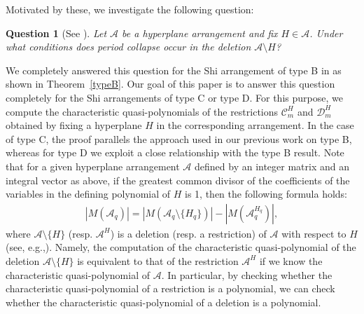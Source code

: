 \documentclass{article}
\theoremstyle{plain}
\newtheorem{Que}[Them]{Question}
\theoremstyle{definition}
\theoremstyle{remark}
\numberwithin{equation}{section}
\newcommand{\Ac}{\mathcal{A}}
\begin{document}
\medskip

Motivated by these, we investigate the following question:
\begin{Que}[{See \cite[Question 1.2]{HN2024}}]\label{q}
Let $\mathcal{A}$ be a hyperplane arrangement and fix $H \in \mathcal{A}$. Under what conditions does period collapse occur in the deletion $\mathcal{A} \setminus {H}$?
\end{Que}
We completely answered this question for the Shi arrangement of type B in \cite{HN2024} as shown in Theorem~\ref{typeB}. 
Our goal of this paper is to answer this question completely for the Shi arrangements of type C or type D. 
For this purpose, we compute the characteristic quasi-polynomials of the restrictions $\mathcal{C}_m^H$ and $\mathcal{D}_m^H$ obtained by fixing a hyperplane $H$ in the corresponding arrangement. In the case of type C, the proof parallels the approach used in our previous work on type B, whereas for type D we exploit a close relationship with the type B result. 
Note that for a given hyperplane arrangement $\Ac$ defined by an integer matrix and an integral vector as above, if the greatest common divisor of the coefficients of the variables in the defining polynomial of $H$ is 1, then the following formula holds: 
\begin{align}\label{eq:del-res}
    |M(\mathcal{A}_q)|=\left|M\left(\mathcal{A}_q\setminus \{H_{q}\}\right)\right| - \left|M\left(\mathcal{A}_q^{H_{q}}\right)\right|, 
\end{align}
where $\Ac \setminus \{H\}$ (resp. $\Ac^H$) is a deletion (resp. a restriction) of $\Ac$ with respect to $H$ (see, e.g.,\cite[Corollary 4.2]{MN2024}). 
Namely, the computation of the characteristic quasi-polynomial of the deletion $\Ac \setminus \{H\}$ is equivalent to that of the restriction $\Ac^H$ if we know the characteristic quasi-polynomial of $\Ac$. 
In particular, by checking whether the characteristic quasi-polynomial of a restriction is a polynomial, we can check whether the characteristic quasi-polynomial of a deletion is a polynomial. 
\end{document}
